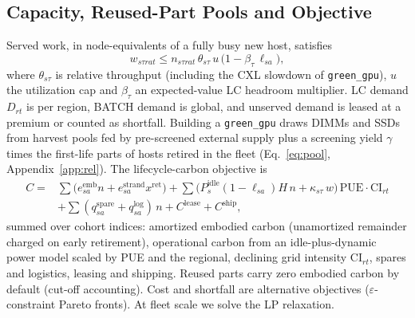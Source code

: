\documentclass{article} %
\begin{document}
\subsection{Capacity, Reused-Part Pools and Objective}
\label{sec:method_cap}
\label{sec:method_obj}
Served work, in node-equivalents of a fully busy new host, satisfies
\begin{equation}
w_{s\tau r a t} \le n_{s\tau r a t}\,\theta_{s\tau}\, u \,\big(1 - \beta_\tau\, \ell_{s a}\big),
\label{eq:capacity}
\end{equation}
where $\theta_{s\tau}$ is relative throughput (including the CXL slowdown of \texttt{green\_gpu}), $u$ the utilization cap and $\beta_\tau$ an expected-value LC headroom multiplier. LC demand $D_{rt}$ is per region, BATCH demand is global, and unserved demand is leased at a premium or counted as shortfall. Building a \texttt{green\_gpu} draws DIMMs and SSDs from harvest pools fed by pre-screened external supply plus a screening yield $\gamma$ times the first-life parts of hosts retired in the fleet (Eq.~\ref{eq:pool}, Appendix~\ref{app:rel}). The lifecycle-carbon objective is
\begin{equation}
\begin{split}
C = {} & \sum \big(e^{\text{emb}}_{s a} n + e^{\text{strand}}_{s a} x^{\text{ret}}\big) + \sum \big(P^{\text{idle}}_s (1-\ell_{sa}) H\, n + \kappa_{s\tau}\, w\big)\,\text{PUE}\cdot\text{CI}_{r t} \\
& + \sum (q^{\text{spare}}_{sa} + q^{\text{log}}_{sa})\, n + C^{\text{lease}} + C^{\text{ship}},
\end{split}
\label{eq:objective}
\end{equation}
summed over cohort indices: amortized embodied carbon (unamortized remainder charged on early retirement), operational carbon from an idle-plus-dynamic power model scaled by PUE and the regional, declining grid intensity $\text{CI}_{rt}$, spares and logistics, leasing and shipping. Reused parts carry zero embodied carbon by default (cut-off accounting). Cost and shortfall are alternative objectives ($\varepsilon$-constraint Pareto fronts). At fleet scale we solve the LP relaxation.
\end{document}
